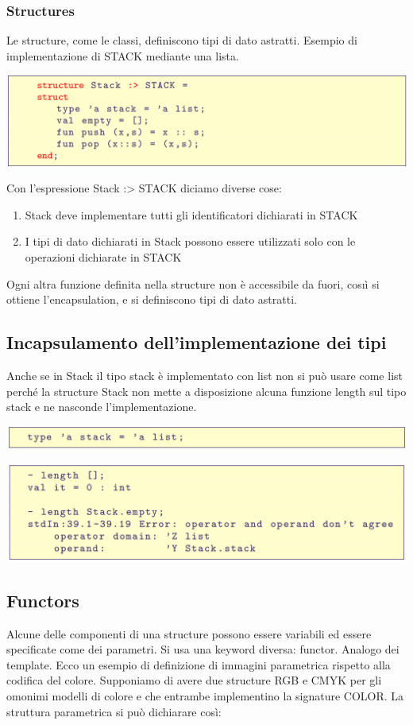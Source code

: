 \documentclass[10pt]{article}
\begin{document}
\subsubsection{Structures}
Le structure, come le classi, definiscono tipi di dato astratti.
Esempio di implementazione di STACK mediante una lista.

\includegraphics[scale=0.2]{Immagini/ml47.png}

Con l’espressione Stack :> STACK diciamo diverse cose:
\begin{enumerate}
    \item Stack deve implementare tutti gli identificatori dichiarati in STACK
    \item I tipi di dato dichiarati in Stack possono essere utilizzati solo con le
operazioni dichiarate in STACK
\end{enumerate}
Ogni altra funzione definita nella structure non è accessibile da fuori, cosıì si ottiene l’encapsulation, e si definiscono tipi di dato astratti.
\subsection{Incapsulamento dell’implementazione dei tipi}
Anche se in Stack il tipo stack è implementato con list non si può usare come list perché la structure Stack non mette a disposizione alcuna
funzione length sul tipo stack e ne nasconde l’implementazione.

\includegraphics[scale=0.2]{Immagini/ml48.png}

\includegraphics[scale=0.2]{Immagini/ml49.png}
\subsection{Functors}
Alcune delle componenti di una structure possono essere variabili
ed essere specificate come dei parametri.
Si usa una keyword diversa: functor. Analogo dei template.
Ecco un esempio di definizione di immagini parametrica rispetto
alla codifica del colore.
Supponiamo di avere due structure RGB e CMYK per gli
omonimi modelli di colore e che entrambe implementino la signature COLOR.
La struttura parametrica si può dichiarare così:
\end{document}

